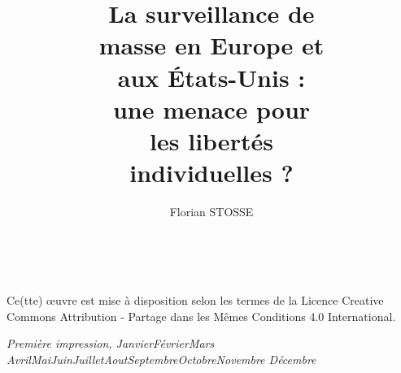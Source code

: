 \documentclass[nobib,justified,fonts,a4paper]{tufte-book} %
\title{La surveillance de \\masse en Europe et \\aux
\'Etats-Unis :\\ \newline une menace pour \\les libertés \\individuelles ?} %
\author{Florian STOSSE} %
\newcommand{\monthyear}{\ifcase\month\or Janvier\or Février\or Mars\or
Avril\or Mai\or Juin\or Juillet\or Aout\or Septembre\or Octobre\or Novembre\or
Décembre\fi\space\number\year} %
\newcommand{\blankpage}{\newpage\hbox{}\thispagestyle{empty}\newpage} %
\begin{document}
\frontmatter


\maketitle %


\newpage
\begin{fullwidth}
~\vfill
\thispagestyle{empty}
\setlength{\parindent}{0pt}
\setlength{\parskip}{\baselineskip}


\par{}

\par Ce(tte) œuvre est mise à disposition selon les termes de la Licence Creative Commons Attribution - Partage dans les Mêmes Conditions 4.0 International.

\par\textit{Première impression, \monthyear}
\end{fullwidth}


\blankpage
{} %







\cleardoublepage


\end{document}

